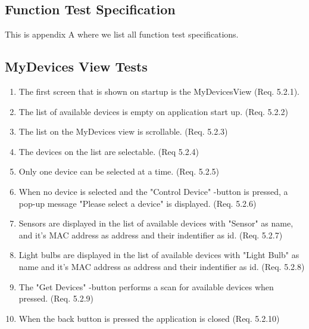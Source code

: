 \documentclass[a4paper]{article}
\newlength{\testlabellength}
\newenvironment{testlist}{\begin{enumerate}[label=\bfseries Test \thesubsection.\arabic* , labelindent=0pt, labelwidth=\testlabellength , leftmargin=2cm]}{\end{enumerate}}
\begin{document}
\newpage
\begin{appendices}

\section{Function Test Specification} \label{appendix:section:functiontest}
This is appendix A where we list all function test specifications.

\subsection{MyDevices View Tests}
\begin{testlist}

    \item The first screen that is shown on startup is the MyDevicesView (Req. 5.2.1).
    
	\item The list of available devices is empty on application start up. (Req. 5.2.2)
   
    \item The list on the MyDevices view is scrollable. (Req. 5.2.3)
   
    \item The devices on the list are selectable. (Req 5.2.4)
   
    \item Only one device can be selected at a time. (Req. 5.2.5)
   
    \item When no device is selected and the "Control Device" -button is pressed, a pop-up message "Please select a device" is displayed. (Req. 5.2.6)
   
    \item Sensors are displayed in the list of available devices with "Sensor" as name, and it's MAC address as address and their indentifier as id. (Req. 5.2.7)
   
    \item Light bulbs are displayed in the list of available devices with "Light Bulb" as name and it's MAC address as address and their indentifier as id. (Req. 5.2.8)
   
    \item The "Get Devices" -button performs a scan for available devices when pressed. (Req. 5.2.9)
   
    \item When the back button is pressed the application is closed (Req. 5.2.10)
    

\end{testlist}
\end{appendices}
\end{document}
